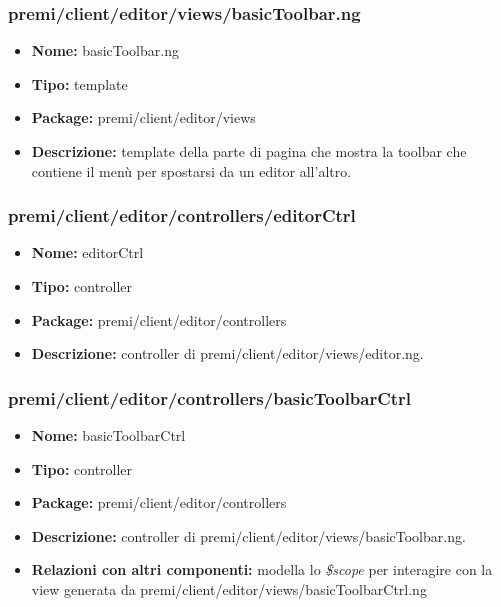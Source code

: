 \subsubsection{premi/client/editor/views/basicToolbar.ng}
\begin{itemize}
  \item[] \textbf{Nome:} basicToolbar.ng
  \item[] \textbf{Tipo:} template
  \item[] \textbf{Package:} premi/client/editor/views
  \item[] \textbf{Descrizione:} template della parte di pagina che mostra la toolbar che contiene il menù per spostarsi da un editor all'altro.
\end{itemize}
\subsubsection{premi/client/editor/controllers/editorCtrl}
\begin{itemize}
  \item[] \textbf{Nome:} editorCtrl
  \item[] \textbf{Tipo:} controller
  \item[] \textbf{Package:} premi/client/editor/controllers
  \item[] \textbf{Descrizione:} controller di premi/client/editor/views/editor.ng.
\end{itemize}
\subsubsection{premi/client/editor/controllers/basicToolbarCtrl}
\begin{itemize}
  \item[] \textbf{Nome:} basicToolbarCtrl
  \item[] \textbf{Tipo:} controller
  \item[] \textbf{Package:} premi/client/editor/controllers
  \item[] \textbf{Descrizione:} controller di premi/client/editor/views/basicToolbar.ng.
  \item[] \textbf{Relazioni con altri componenti:} modella lo \textit{\$scope} per interagire con la view generata da premi/client/editor/views/basicToolbarCtrl.ng
\end{itemize}


